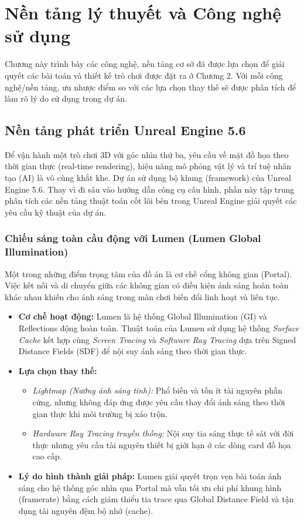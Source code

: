 \documentclass[../DoAn.tex]{subfiles}
\begin{document}
\chapter{Nền tảng lý thuyết và Công nghệ sử dụng}
\label{chuong:cong_nghe}

Chương này trình bày các công nghệ, nền tảng cơ sở đã được lựa chọn để giải quyết các bài toán và thiết kế trò chơi được đặt ra ở Chương 2. Với mỗi công nghệ/nền tảng, ưu nhược điểm so với các lựa chọn thay thế sẽ được phân tích để làm rõ lý do sử dụng trong dự án.

\section{Nền tảng phát triển Unreal Engine 5.6}
\label{section:3.1}

Để vận hành một trò chơi 3D với góc nhìn thứ ba, yêu cầu về mặt đồ họa theo thời gian thực (real-time rendering), hiệu năng mô phỏng vật lý và trí tuệ nhân tạo (AI) là vô cùng khắt khe. Dự án sử dụng bộ khung (framework) của Unreal Engine 5.6. Thay vì đi sâu vào hướng dẫn công cụ cấu hình, phần này tập trung phân tích các nền tảng thuật toán cốt lõi bên trong Unreal Engine giải quyết các yêu cầu kỹ thuật của dự án.

\subsection{Chiếu sáng toàn cầu động với Lumen (Lumen Global Illumination)}
Một trong những điểm trọng tâm của đồ án là cơ chế cổng không gian (Portal). Việc kết nối và di chuyển giữa các không gian có điều kiện ánh sáng hoàn toàn khác nhau khiến cho ánh sáng trong màn chơi biến đổi linh hoạt và liên tục.
\begin{itemize}
    \item \textbf{Cơ chế hoạt động:} Lumen là hệ thống Global Illumination (GI) và Reflections động hoàn toàn. Thuật toán của Lumen sử dụng hệ thống \textit{Surface Cache} kết hợp cùng \textit{Screen Tracing} và \textit{Software Ray Tracing} dựa trên Signed Distance Fields (SDF) để nội suy ánh sáng theo thời gian thực.
    \item \textbf{Lựa chọn thay thế:} 
    \begin{itemize}
        \item \textit{Lightmap (Nướng ánh sáng tĩnh):} Phổ biến và tốn ít tài nguyên phần cứng, nhưng không đáp ứng được yêu cầu thay đổi ánh sáng theo thời gian thực khi môi trường bị xáo trộn.
        \item \textit{Hardware Ray Tracing truyền thống:} Nội suy tia sáng thực tế sát với đời thực nhưng yêu cầu tài nguyên thiết bị giới hạn ở các dòng card đồ họa cao cấp. 
    \end{itemize}
    \item \textbf{Lý do hình thành giải pháp:} Lumen giải quyết trọn vẹn bài toán ánh sáng cho hệ thống góc nhìn qua Portal mà vẫn tối ưu chi phí khung hình (framerate) bằng cách giảm thiểu tia trace qua Global Distance Field và tận dụng tài nguyên đệm bộ nhớ (cache).
\end{itemize}
\end{document}
